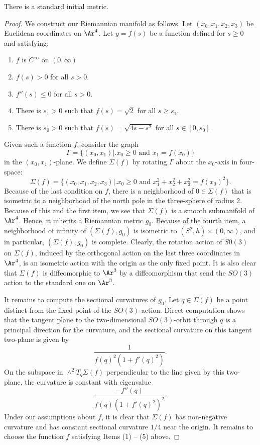 \begin{lemma}
\label{lem:existence-standard-initial-metric}
\label{stdinit}
There is a standard initial metric.
\end{lemma}

\begin{proof}
We construct our Riemannian manifold as follows. Let
$(x_0,x_1,x_2,x_3)$ be Euclidean coordinates on $\Ar^4$. Let
$y=f(s)$ be a function defined for $s\ge 0$ and satisfying:
\begin{enumerate}
\item[(1)] $f$ is $C^\infty$ on $(0,\infty)$
\item[(2)] $f(s)>0$ for all $s>0$.
\item[(3)] $f''(s)\le 0$ for all $s>0$.
\item[(4)] There is $s_1>0$ such that $f(s)=\sqrt{2}$ for all $s\ge
s_1$.
\item[(5)] There is $s_0>0$ such that
$f(s)=\sqrt{4s-s^2}$ for all $s\in [0,s_0]$.
\end{enumerate}
Given such a function $f$, consider the graph
$$\Gamma=\{(x_0,x_1)\bigl|\bigr. x_0\ge 0 \text{ and }
x_1=f(x_0)\}$$ in the $(x_0,x_1)$-plane. We define $\Sigma(f)$ by
rotating $\Gamma$ about the $x_0$-axis in four-space:
$$\Sigma(f)=\{(x_0,x_1,x_2,x_3)\bigl|\bigr. x_0\ge 0 \text{ and }
x_1^2+x_2^2+x_3^2=f(x_0)^2\}.$$ Because of the last condition on
$f$, there is a neighborhood of $0\in \Sigma(f)$ that is isometric
to a neighborhood of the north pole in the three-sphere of radius
$2$. Because of this and the first item, we see that $\Sigma(f)$ is
a smooth submanifold of $\Ar^4$. Hence, it inherits a Riemannian
metric $g_0$. Because of the fourth item, a neighborhood of infinity
of $(\Sigma(f),g_0)$ is isometric to $(S^2,h)\times (0,\infty)$, and
in particular, $(\Sigma(f),g_0)$ is complete. Clearly, the rotation
action of $S0(3)$ on $\Sigma(f)$, induced by the orthogonal action
on the last three coordinates in $\Ar^4$, is an isometric action
with the origin as the only fixed point. It is also clear that
$\Sigma(f)$ is diffeomorphic to $\Ar^3$ by a diffeomorphism that
send the $SO(3)$ action to the standard one on $\Ar ^3$.

It remains to compute the sectional curvatures of $g_0$. Let $q\in
\Sigma(f)$ be a point distinct from the fixed point of the
$SO(3)$-action. Direct computation shows that the tangent plane to
the two-dimensional $SO(3)$-orbit through $q$ is a principal
direction for the curvature, and the sectional curvature on this
 tangent two-plane  is given by
$$\frac{1}{f(q)^2(1+f'(q)^2)}.$$
On the subspace in $\wedge^2T_q\Sigma(f)$ perpendicular to the line
given by this two-plane, the curvature is constant  with eigenvalue
$$\frac{-f''(q)}{f(q)(1+f'(q)^2)^2}.$$
Under our assumptions about $f$, it is clear that $\Sigma(f)$ has
non-negative curvature and has constant sectional curvature $1/4$
near the origin. It remains to choose the function $f$ satisfying
Items (1) -- (5) above.



\end{proof}
